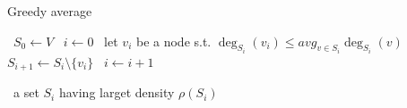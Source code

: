 \begin{algorithm}
    \caption{Greedy average}\label{alg:greedy_avg}
    \begin{algorithmic}%
            \State~$S_0 \gets V$
            \State~$i \gets 0$
                    \State~let $v_i$ be a node s.t. $\deg_{S_i}(v_i) \leq avg_{v \in S_i} \deg_{S_i}(v)$
                    \State~$S_{i+1} \gets S_i \setminus \{v_i\}$
                    \State~$i \gets i+1$
                \EndWhile
                
            \Return~a set $S_i$ having larget density $\rho(S_i)$
        \EndProcedure
    \end{algorithmic}
\end{algorithm}
